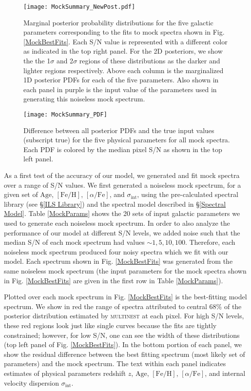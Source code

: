 \documentclass[twocolumn]{aastex6}
\def\feh{\mathrm{[Fe/H]}}
\def\afe{[\alpha/\mathrm{Fe}]}
\def\age{\mathrm{Age}}
\def\disp{\sigma_\mathrm{int}}
\begin{document}
\begin{figure}
\centering
\texttt{[image: MockSummary\_NewPost.pdf]}
\caption{Marginal posterior probability distributions for the five galactic parameters corresponding to the fits to mock spectra shown in Fig. \ref{MockBestFits}.  Each S/N value is represented with a different color as indicated in the top right panel.  For the 2D posteriors, we show the the 1$\sigma$ and 2$\sigma$ regions of these distributions as the darker and lighter regions respectively. Above each column is the marginalized 1D posterior PDFs for each of the five parameters. Also shown in each panel in purple is the input value of the parameters used in generating this noiseless mock spectrum.}
\label{MockPosteriors}
\end{figure}

\begin{figure}
\centering
\texttt{[image: MockSummary\_PDF]}
\caption{Difference between all posterior PDFs and the true input values (subscript true) for the five physical parameters for all mock spectra. Each PDF is colored by the median pixel S/N as shown in the top left panel.}
\label{MockSummary}
\end{figure}


As a first test of the accuracy of our model, we generated and fit mock spectra over a range of S/N values.  
We first generated a noiseless mock spectrum, for a given set of $\age$, $\feh$, $\afe$, and $\disp$, using the pre-calculated spectral library (see \S \ref{ILS Library}) and the spectral model described in \S \ref{Spectral Model}.
Table \ref{MockParams} shows the 20 sets of input galactic parameters we used to generate each noiseless mock spectrum. 
In order to also analyze the performance of our model at different S/N levels, we added noise such that the median S/N of each mock spectrum had values $\sim 1, 5, 10, 100$.
Therefore, each noiseless mock spectrum produced four noisy spectra which we fit with our model.
Each spectrum shown in Fig. \ref{MockBestFits} was generated from the same noiseless mock spectrum (the input parameters for the mock spectra shown in Fig. \ref{MockBestFits} are given in the first row in Table \ref{MockParams}).

Plotted over each mock spectrum in Fig. \ref{MockBestFits} is the best-fitting model spectrum.
We show in red the range of spectra attributed to central 68\% of the posterior distribution estimated by \textsc{multinest} at each pixel.
For high S/N levels, these red regions look just like single curves because the fits are tightly constrained; however, for low S/N, one can see the width of these distributions (top left panel of Fig. \ref{MockBestFits}).
In the bottom portion of each panel, we show the residual difference between the best fitting spectrum (most likely set of parameters) and the mock spectrum.
The text within each panel indicates estimates of physical parameters redshift $z$, $\age$, $\feh$, $\afe$, and internal velocity dispersion $\disp$.
\end{document}
